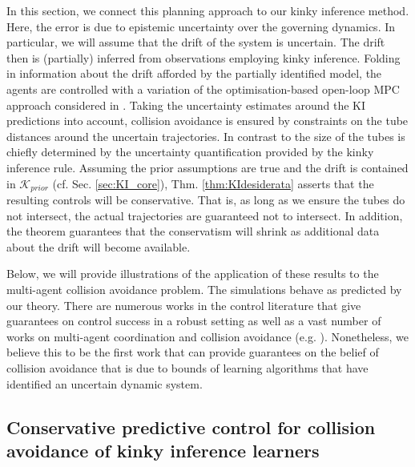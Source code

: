 In this section, we connect this planning approach to our kinky inference method. Here, the error is due to epistemic uncertainty over the governing dynamics. 
In particular, we will assume that the drift of the system is uncertain. The drift then is (partially) inferred from observations employing kinky inference. Folding in information about the drift afforded by the partially identified model, the agents are controlled with a variation of the optimisation-based open-loop MPC approach considered in \cite{LyonsACC2012,Lyons2011}. Taking the uncertainty estimates around the KI predictions into account, collision avoidance is ensured by constraints on the tube distances around the uncertain trajectories. In contrast to \cite{LyonsACC2012,Lyons2011} the size of the tubes is chiefly determined by the uncertainty quantification provided by the kinky inference rule. Assuming the prior assumptions are true and the drift is contained in $\mathcal K_{prior}$ (cf. Sec. \ref{sec:KI_core}), Thm. \ref{thm:KIdesiderata} asserts that the resulting controls will be conservative. That is, as long as we ensure the tubes do not intersect, the actual trajectories are guaranteed not to intersect. In addition, the theorem guarantees that the conservatism will shrink as additional data about the drift will become available. 

Below, we will provide illustrations of the application of these results to the multi-agent collision avoidance problem. The simulations behave as predicted by our theory. 
There are numerous works in the control literature that give guarantees on control success in a robust setting as well as a vast number of works on multi-agent 
coordination and collision avoidance (e.g. \cite{schouwenaars2001mixed,Kuwata2005,Kuwata2006,Ong2010,LyonsACC2012,calliessARMS2011:LNAI}). Nonetheless, we believe this to be the first work that can provide guarantees on the belief of collision avoidance that is due to bounds of learning algorithms that have identified an uncertain dynamic system.

\subsection{Conservative predictive control for collision avoidance of kinky inference learners}


